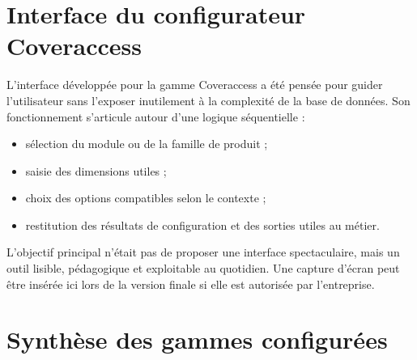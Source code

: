 \chapter{Interface du configurateur Coveraccess}

L'interface développée pour la gamme Coveraccess a été pensée pour guider l'utilisateur sans l'exposer inutilement à la complexité de la base de données. Son fonctionnement s'articule autour d'une logique séquentielle :

\begin{itemize}[leftmargin=1.4cm]
\item sélection du module ou de la famille de produit ;
\item saisie des dimensions utiles ;
\item choix des options compatibles selon le contexte ;
\item restitution des résultats de configuration et des sorties utiles au métier.
\end{itemize}

L'objectif principal n'était pas de proposer une interface spectaculaire, mais un outil lisible, pédagogique et exploitable au quotidien. Une capture d'écran peut être insérée ici lors de la version finale si elle est autorisée par l'entreprise.

\chapter{Synthèse des gammes configurées}

